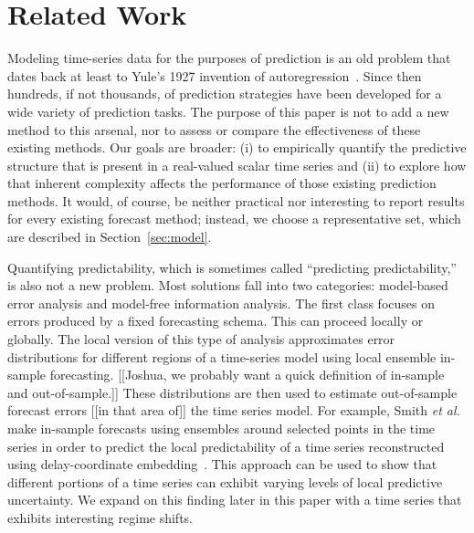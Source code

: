 \section{Related Work }\label{sec:related}

Modeling time-series data for the purposes of prediction is an old
problem that dates back at least to Yule's 1927 invention of
autoregression~\cite{Yule27}.  Since then hundreds, if not thousands,
of prediction strategies have been developed for a wide variety of
prediction tasks.  The purpose of this paper is not to add a new
method to this arsenal, nor to assess or compare the effectiveness of
these existing methods.  Our goals are broader: (i) to empirically
quantify the predictive structure that is present in a real-valued
scalar time series and (ii) to explore how that inherent complexity
affects the performance of those existing prediction methods.  It
would, of course, be neither practical nor interesting to report
results for every existing forecast method; instead, we choose a
representative set, which are described in Section~\ref{sec:model}.

Quantifying predictability, which is sometimes called ``predicting
predictability,'' is also not a new problem.  Most solutions fall into
two categories: model-based error analysis and model-free information
analysis.
%
%
%
The first class focuses on errors produced by a fixed forecasting
schema.  This can proceed locally or globally.  The local version of
this type of analysis approximates error distributions for different
regions of a time-series model using local ensemble in-sample
forecasting.  [[Joshua, we probably want a quick definition of
    in-sample and out-of-sample.]] These distributions are then used
to estimate out-of-sample forecast errors [[in that area of]] the time
series model.  For example, Smith {\sl et al.} make in-sample
forecasts using ensembles around selected points in the time series in
order to predict the local predictability of a time series
reconstructed using delay-coordinate embedding~\cite{Smith199250}.
This approach can be used to show that different portions of a time
series can exhibit varying levels of local predictive uncertainty.  We
expand on this finding later in this paper with a time series that
exhibits interesting regime shifts.

